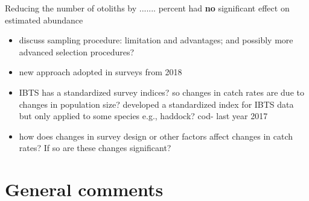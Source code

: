 \documentclass[a4paper 12pt]{article}
\numberwithin{equation}{section}
\begin{document}
Reducing the number of otoliths by ....... percent had {\bf no} significant effect on estimated abundance
\begin{itemize}
\item discuss sampling procedure: limitation and advantages; and possibly more advanced selection procedures? 
\item new approach adopted in surveys from 2018 
\item IBTS has a standardized survey indices? so changes in catch rates are due to changes in population size? \citet{berg2014evaluation} developed a standardized index for IBTS data but only applied to some species e.g., haddock? cod- last year 2017
\item how does changes in survey design or other factors affect changes in catch rates? If so are these changes  significant? 
\end{itemize}


\section{General comments}
\end{document}
